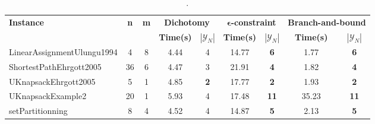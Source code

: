 \begin{table}[!h]
\centering
\hspace*{-1cm}\begin{tabular}{lcccccccc}
\toprule
\textbf{Instance} & \textbf{n} & \textbf{m} & \multicolumn{2}{c}{\textbf{Dichotomy}} & \multicolumn{2}{c}{\textbf{$\mathbf{\epsilon}$-constraint}}  & \multicolumn{2}{c}{\textbf{Branch-and-bound}}
\\
\cmidrule(r){4-5} \cmidrule(r){6-7} \cmidrule(r){8-9}
~ & ~ & ~ & \textbf{Time(s)} & \textbf{$|\mathcal{Y}_N|$} & \textbf{Time(s)} & \textbf{$|\mathcal{Y}_N|$} & \textbf{Time(s)} & \textbf{$|\mathcal{Y}_N|$} \\
\midrule

LinearAssignmentUlungu1994 & 4 & 8 & 4.44 & 4 & 14.77 &  \textbf{6} &  \textcolor{blue2}{1.77} &  \textbf{6} \\
ShortestPathEhrgott2005 & 36 & 6 & 4.47 & 3 & 21.91 &  \textbf{4} &  \textcolor{blue2}{1.82} &  \textbf{4} \\
UKnapsackEhrgott2005 & 5 & 1 & 4.85 &  \textbf{2} & 17.77 &  \textbf{2} &  \textcolor{blue2}{1.93} &  \textbf{2} \\
UKnapsackExample2 & 20 & 1 &  \textcolor{blue2}{5.93} & 4 & 17.48 &  \textbf{11} & 35.23 &  \textbf{11} \\
setPartitionning & 8 & 4 & 4.52 & 4 & 14.87 &  \textbf{5} &  \textcolor{blue2}{2.13} &  \textbf{5} \\
\bottomrule
\end{tabular}
\caption{.}
\label{tab:table_compare}
\end{table}

